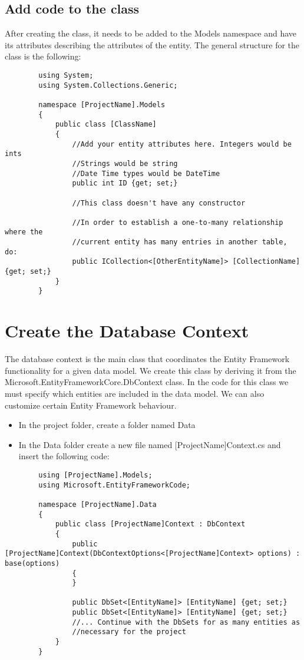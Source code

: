 \documentclass{report}
\begin{document}
    \subsection{Add code to the class}
    After creating the class, it needs to be added to the Models namespace and have its attributes
    describing the attributes of the entity. The general structure for the class is the following:

    \lstset{style=sharpc}
    \begin{lstlisting}
        using System;
        using System.Collections.Generic;

        namespace [ProjectName].Models
        {
            public class [ClassName]
            {
                //Add your entity attributes here. Integers would be ints
                //Strings would be string
                //Date Time types would be DateTime
                public int ID {get; set;}

                //This class doesn't have any constructor

                //In order to establish a one-to-many relationship where the
                //current entity has many entries in another table, do:
                public ICollection<[OtherEntityName]> [CollectionName] {get; set;}
            }
        }
    \end{lstlisting}

    \section{Create the Database Context}
    The database context is the main class that coordinates the Entity Framework
    functionality for a given data model. We create this class by deriving it from
    the Microsoft.EntityFrameworkCore.DbContext class. In the code for this class
    we must specify which entities are included in the data model. We can also
    customize certain Entity Framework behaviour.

    \begin{itemize}
        \item In the project folder, create a folder named Data
        \item In the Data folder create a new file named [ProjectName]Context.cs
        and insert the following code:
    \end{itemize}

    \lstset{style=sharpc}
    \begin{lstlisting}
        using [ProjectName].Models;
        using Microsoft.EntityFrameworkCode;

        namespace [ProjectName].Data
        {
            public class [ProjectName]Context : DbContext
            {
                public [ProjectName]Context(DbContextOptions<[ProjectName]Context> options) : base(options)
                {
                }

                public DbSet<[EntityName]> [EntityName] {get; set;}
                public DbSet<[EntityName]> [EntityName] {get; set;}
                //... Continue with the DbSets for as many entities as
                //necessary for the project
            }
        }
    \end{lstlisting}
\end{document}
